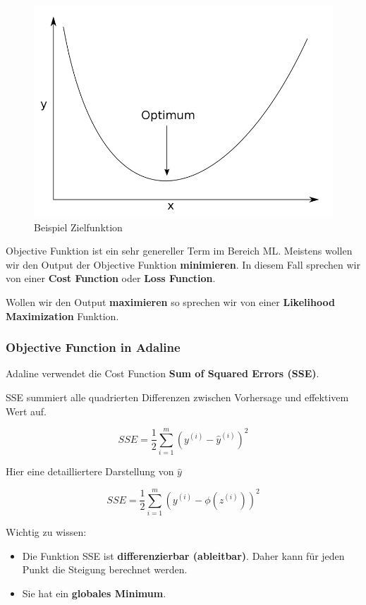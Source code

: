\begin{figure}[h!]
	\includegraphics[scale=0.4]{figures/objective_minimum}
	\caption{Beispiel Zielfunktion}
	\label{fig:objective_minimum}
\end{figure}



Objective Funktion ist ein sehr genereller Term im Bereich ML.
Meistens wollen wir den Output der Objective Funktion \textbf{minimieren}. In diesem Fall sprechen wir von einer \textbf{Cost Function} oder \textbf{Loss Function}.


Wollen wir den Output \textbf{maximieren} so sprechen wir von einer \textbf{Likelihood Maximization} Funktion.



 
\newpage
\subsubsection{Objective Function in Adaline}

Adaline verwendet die Cost Function \textbf{Sum of Squared Errors (SSE)}.

SSE summiert alle quadrierten Differenzen zwischen Vorhersage und effektivem Wert auf.

$$ SSE = \frac{1}{2} \sum_{i=1}^{m}(y^{(i)} - \hat{y}^{(i)})^{2} $$

Hier eine detailliertere Darstellung von $\hat{y}$

$$ SSE = \frac{1}{2} \sum_{i=1}^{m}(y^{(i)} - \phi(z^{(i)}))^{2} $$


Wichtig zu wissen:
\begin{itemize}
  \item Die Funktion SSE ist \textbf{differenzierbar (ableitbar)}. Daher kann für jeden Punkt die Steigung berechnet werden.
  \item Sie hat ein \textbf{globales Minimum}.
\end{itemize}



